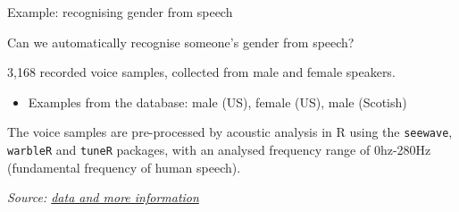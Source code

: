 \documentclass[compress]{beamer}
\newcommand{\source}[2]{{\tiny\it Source: \href{#1}{#2}}}
\begin{document}
\begin{frame}{Example: recognising gender from speech}

Can we automatically recognise someone's gender from speech?

3,168 recorded voice samples, collected from male and female speakers.

\begin{itemize}

\item Examples from the database: male (US), female (US), male (Scotish)
\end{itemize}

    \begin{center}
    \hspace{0.3em}
    \hspace{0.3em}
    \end{center}


The voice samples are pre-processed by acoustic analysis in R using the
{\tt seewave}, {\tt warbleR} and {\tt tuneR} packages, with an analysed frequency range of
0hz-280Hz (fundamental frequency of human speech).


\source{https://www.kaggle.com/primaryobjects/voicegender}{data and more information}


\end{frame}
\end{document}
